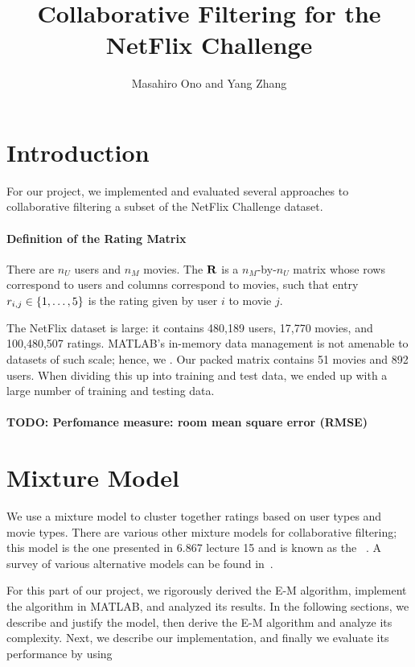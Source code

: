 \documentclass{article}
\title{Collaborative Filtering for the NetFlix Challenge}
\author{Masahiro Ono and Yang Zhang}
\begin{document}
\maketitle

\vspace{-10mm}

\section{Introduction}

For our project, we implemented and evaluated several approaches to
collaborative filtering a subset of the NetFlix Challenge dataset.

\paragraph{Definition of the Rating Matrix}
There are $n_U$ users and $n_M$ movies.  The 
${\bf R}$ is a $n_M$-by-$n_U$ matrix whose rows correspond to users
and columns correspond to movies, such that entry $r_{i,j} \in
{\left\{ 1, \dots, 5 \right\}}$ is the rating given by user $i$ to movie $j$.

The NetFlix dataset is large: it contains 480,189 users, 17,770
movies, and 100,480,507 ratings. MATLAB's in-memory data management is
not amenable to datasets of such scale; hence, we . Our packed matrix
contains 51 movies and 892 users. When dividing this up into training
and test data, we ended up with a large number of training and testing
data.

\paragraph{TODO: Perfomance measure: room mean square error (RMSE)}

\section{Mixture Model}

We use a mixture model to cluster together ratings based on user types
and movie types. There are various other mixture models for
collaborative filtering; this model is the one presented in 6.867
lecture 15 and is known as the ~\cite{si03flexible}. A survey of various alternative models
can be found in~\cite{cmu-study}.

For this part of our project, we rigorously derived the E-M algorithm,
implement the algorithm in MATLAB, and analyzed its results. In the
following sections, we describe and justify the model, then derive the
E-M algorithm and analyze its complexity. Next, we describe our
implementation, and finally we evaluate its performance by using
\end{document}
